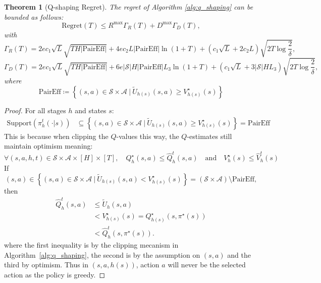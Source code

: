 \documentclass[twoside]{article}
\newtheorem{theorem}{Theorem}
\newcommand{\highq}{\widetilde{U}} %
\begin{document}
\begin{theorem}[Q-shaping Regret]
    The regret of Algorithm \ref{alg:q_shaping} can be bounded as follows:
    \[
    \mathrm{Regret}(T)\le R^{\max}\Gamma_R(T)+D^{\max}\Gamma_D(T),
    \]
with
    \[ \Gamma_R(T)=2ec_1\sqrt{L}\sqrt{TH|\mathrm{PairEff}|}+4ec_2L|\mathrm{PairEff}|\ln(1+T)+\left(c_1\sqrt{L}+2c_2L\right)\sqrt{2T\log\dfrac{2}{\delta}},
    \]
    \[
    \Gamma_D(T)=2ec_1\sqrt{L}\sqrt{TH|\mathrm{PairEff}|}+6e|\mathcal{S}|H|\mathrm{PairEff}|L_3\ln(1+T)+\left(c_1\sqrt{L}+3|\mathcal{S}|HL_3\right)\sqrt{2T\log\dfrac{2}{\delta}},
    \]
    where 
    \[ \mathrm{PairEff} \coloneq \left \lbrace (s,a) \in \mathcal{S} \times \mathcal{A} ~ | ~ \highq_{h(s)}(s,a) \geq V^{\star}_{h(s)}(s) \right \rbrace \]
\end{theorem}
\begin{proof}
    For all stages $h$ and states $s$: 
\begin{align}
    \mathrm{Support}(\pi^t_h(\cdot|s)) & \subseteq \left \lbrace (s,a) \in \mathcal{S} \times \mathcal{A} ~ | ~ \highq_{h(s)}(s,a) \geq V^{\star}_{h(s)}(s) \right \rbrace = \mathrm{PairEff}  \label{eq:support_argument}
\end{align}
This is because when clipping the $Q$-values this way, the $Q$-estimates still maintain optimism meaning: 
\[
\forall (s,a,h,t) \in \mathcal{S}  \times \mathcal{A} \times [H] \times [T], \quad Q_h^{\star}(s,a) \leq \widehat{Q}_h^t(s,a) \quad\text{and}\quad V_h^{\star}(s) \leq \widehat{V}_h^t(s) 
\]
If
\[ 
    (s,a) \in \left \lbrace (s,a) \in \mathcal{S} \times \mathcal{A} ~ | ~ \highq_{h(s)}(s,a) < V^{\star}_{h(s)}(s) \right \rbrace = \left ( \mathcal{S} \times \mathcal{A} \right ) \setminus \mathrm{PairEff},
\]
then 
\begin{align*}
    \widehat{Q}_h^t(s,a)  & \leq \highq_h(s,a) \\
    & < V^{\star}_{h(s)}(s) = Q^{\star}_{h(s)}(s, \pi^{\star}(s)) \\
    & < \widehat{Q}_h^t(s,\pi^{\star}(s)).
\end{align*}
where the first inequality is by the clipping mecanism in Algorithm~\ref{alg:q_shaping}, the second is by the assumption on $(s,a)$ and the third by optimism. Thus in $\left (s,a,h(s)\right )$, action $a$ will never be the selected action as the policy is greedy.


\end{proof}
\end{document}
